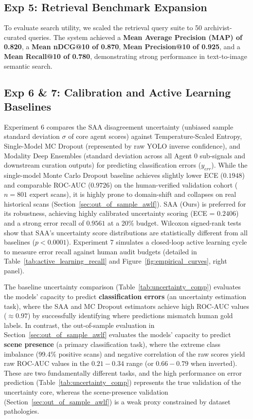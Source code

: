 \documentclass[11pt,a4paper]{article}
\begin{document}
\subsection{Exp 5: Retrieval Benchmark Expansion}\label{sec:retrieval_benchmark}
To evaluate search utility, we scaled the retrieval query suite to 50 archivist-curated queries. 
The system achieved a \textbf{Mean Average Precision (MAP) of 0.820}, a \textbf{Mean nDCG@10 of 0.870}, \textbf{Mean Precision@10 of 0.925}, and a \textbf{Mean Recall@10 of 0.780}, demonstrating strong performance in text-to-image semantic search.

\newpage
\subsection{Exp 6 \& 7: Calibration and Active Learning Baselines}\label{sec:calibration_active_learning}
Experiment 6 compares the SAA disagreement uncertainty (unbiased sample standard deviation $\sigma$ of core agent scores) against Temperature-Scaled Entropy, Single-Model MC Dropout (represented by raw YOLO inverse confidence), and Modality Deep Ensembles (standard deviation across all Agent 0 sub-signals and downstream curation outputs) for predicting classification errors ($y_{err}$). While the single-model Monte Carlo Dropout baseline achieves slightly lower ECE ($0.1948$) and comparable ROC-AUC ($0.9726$) on the human-verified validation cohort ($n=801$ expert scans), it is highly prone to domain-shift and collapses on real historical scans (Section~\ref{sec:out_of_sample_awlf}). SAA (Ours) is preferred for its robustness, achieving highly calibrated uncertainty scoring (ECE = $0.2406$) and a strong error recall of $0.9561$ at a 20\% budget. Wilcoxon signed-rank tests show that SAA's uncertainty score distributions are statistically different from all baselines ($p < 0.0001$).
Experiment 7 simulates a closed-loop active learning cycle to measure error recall against human audit budgets (detailed in Table~\ref{tab:active_learning_recall} and Figure~\ref{fig:empirical_curves}, right panel).

The baseline uncertainty comparison (Table~\ref{tab:uncertainty_comp}) evaluates the models' capacity to predict \textbf{classification errors} (an uncertainty estimation task), where the SAA and MC Dropout estimators achieve high ROC-AUC values ($\approx 0.97$) by successfully identifying where predictions mismatch human gold labels. In contrast, the out-of-sample evaluation in Section~\ref{sec:out_of_sample_awlf} evaluates the models' capacity to predict \textbf{scene presence} (a primary classification task), where the extreme class imbalance (99.4\% positive scans) and negative correlation of the raw scores yield raw ROC-AUC values in the $0.21 - 0.34$ range (or $0.66 - 0.79$ when inverted). These are two fundamentally different tasks, and the high performance on error prediction (Table~\ref{tab:uncertainty_comp}) represents the true validation of the uncertainty core, whereas the scene-presence validation (Section~\ref{sec:out_of_sample_awlf}) is a weak proxy constrained by dataset pathologies.
\end{document}
